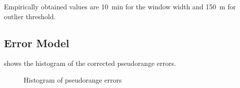 Empirically obtained values are \SI{10}{\minute} for the window width and
\SI{150}{\meter} for outlier threshold.

\subsection{Error Model}
 shows the histogram of the corrected pseudorange
errors.

\begin{figure}[tp]
	\centering
	\caption{Histogram of pseudorange errors}
	\label{fig:impl-error-histogam}
\end{figure}

